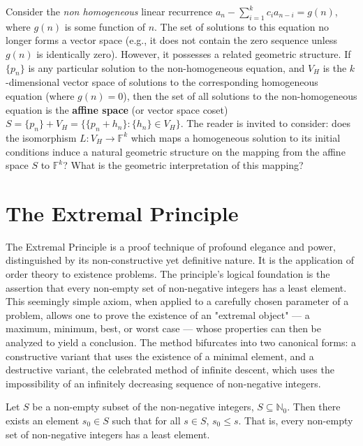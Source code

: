 \begin{theorem}
\begin{remark}
Consider the \textit{non homogeneous} linear recurrence $a_n - \sum_{i=1}^{k} c_i a_{n-i} = g(n)$, where $g(n)$ is some function of $n$. The set of solutions to this equation no longer forms a vector space (e.g., it does not contain the zero sequence unless $g(n)$ is identically zero). However, it possesses a related geometric structure. If $\{p_n\}$ is any particular solution to the non-homogeneous equation, and $V_H$ is the $k$-dimensional vector space of solutions to the corresponding homogeneous equation (where $g(n)=0$), then the set of all solutions to the non-homogeneous equation is the \textbf{affine space} (or vector space coset) $S = \{p_n\} + V_H = \{ \{p_n + h_n\} : \{h_n\} \in V_H \}$. The reader is invited to consider: does the isomorphism $L: V_H \to \mathbb{F}^k$ which maps a homogeneous solution to its initial conditions induce a natural geometric structure on the mapping from the affine space $S$ to $\mathbb{F}^k$? What is the geometric interpretation of this mapping?
\end{remark}

\section{The Extremal Principle}

The Extremal Principle is a proof technique of profound elegance and power, distinguished by its non-constructive yet definitive nature. It is the application of order theory to existence problems. The principle's logical foundation is the assertion that every non-empty set of non-negative integers has a least element. This seemingly simple axiom, when applied to a carefully chosen parameter of a problem, allows one to prove the existence of an "extremal object" — a maximum, minimum, best, or worst case — whose properties can then be analyzed to yield a conclusion. The method bifurcates into two canonical forms: a constructive variant that uses the existence of a minimal element, and a destructive variant, the celebrated method of infinite descent, which uses the impossibility of an infinitely decreasing sequence of non-negative integers.

\begin{lemma}\label{lemma:well_ordering}
Let $S$ be a non-empty subset of the non-negative integers, $S \subseteq \mathbb{N}_0$. Then there exists an element $s_0 \in S$ such that for all $s \in S$, $s_0 \le s$. That is, every non-empty set of non-negative integers has a least element.
\end{lemma}


\end{theorem}
